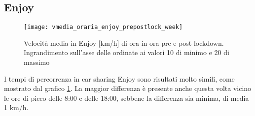 \subsection{Enjoy}

\begin{figure}[H]
	\texttt{[image: vmedia\_oraria\_enjoy\_prepostlock\_week]}
	\caption{Velocità media in Enjoy [km/h] di ora in ora pre e post lockdown. Ingrandimento sull'asse delle ordinate ai valori 10 di minimo e 20 di massimo}
	\label{image:24}
\end{figure}

I tempi di percorrenza in car sharing Enjoy sono risultati molto simili, come mostrato dal grafico \ref{image:24}. La maggior differenza è presente anche questa volta vicino le ore di picco delle 8:00 e delle 18:00, sebbene la differenza sia minima, di media 1 km/h.













